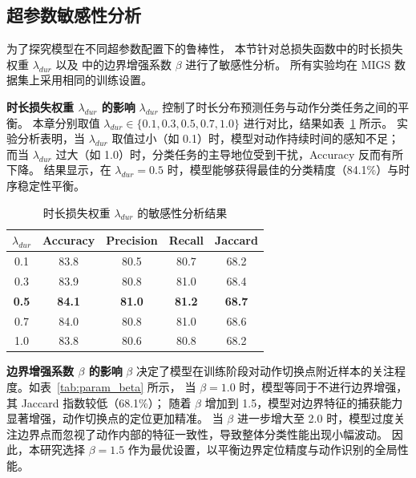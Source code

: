 
\subsection{超参数敏感性分析}

为了探究模型在不同超参数配置下的鲁棒性，
本节针对总损失函数中的时长损失权重 \(\lambda_{dur}\) 以及 \lossshort 中的边界增强系数 \(\beta\) 进行了敏感性分析。
所有实验均在 MIGS 数据集上采用相同的训练设置。

\textbf{时长损失权重 \(\lambda_{dur}\) 的影响}\quad
\(\lambda_{dur}\) 控制了时长分布预测任务与动作分类任务之间的平衡。
本章分别取值 \(\lambda_{dur} \in \{0.1, 0.3, 0.5, 0.7, 1.0\}\) 进行对比，结果如表~\ref{tab:param_lambda} 所示。
实验分析表明，当 \(\lambda_{dur}\) 取值过小（如 0.1）时，模型对动作持续时间的感知不足；
而当 \(\lambda_{dur}\) 过大（如 1.0）时，分类任务的主导地位受到干扰，Accuracy 反而有所下降。
结果显示，在 \(\lambda_{dur} = 0.5\) 时，模型能够获得最佳的分类精度（84.1\%）与时序稳定性平衡。

\begin{table}[htbp]
\small
\renewcommand{\arraystretch}{1.0}
\centering
\caption{时长损失权重 \(\lambda_{dur}\) 的敏感性分析结果}
\label{tab:param_lambda}
\begin{tabular}{ccccc}
    \toprule
    \(\lambda_{dur}\) & Accuracy & Precision & Recall & Jaccard \\ 
    \midrule
    0.1 & 83.8 & 80.5 & 80.7 & 68.2 \\
    0.3 & 83.9 & 80.8 & 81.0 & 68.4 \\
    \textbf{0.5} & \textbf{84.1} & \textbf{81.0} & \textbf{81.2} & \textbf{68.7} \\
    0.7 & 84.0 & 80.8 & 81.0 & 68.6 \\
    1.0 & 83.8 & 80.6 & 80.8 & 68.2 \\ 
    \bottomrule
\end{tabular}
\end{table}

\textbf{边界增强系数 \(\beta\) 的影响}\quad
\(\beta\) 决定了模型在训练阶段对动作切换点附近样本的关注程度。如表~\ref{tab:param_beta} 所示，
当 \(\beta=1.0\) 时，模型等同于不进行边界增强，其 Jaccard 指数较低（68.1\%）；
随着 \(\beta\) 增加到 1.5，模型对边界特征的捕获能力显著增强，动作切换点的定位更加精准。
当 \(\beta\) 进一步增大至 2.0 时，模型过度关注边界点而忽视了动作内部的特征一致性，导致整体分类性能出现小幅波动。
因此，本研究选择 \(\beta=1.5\) 作为最优设置，以平衡边界定位精度与动作识别的全局性能。


